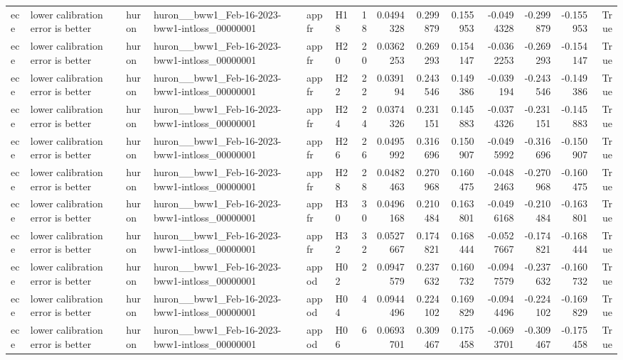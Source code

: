 \begin{longtable}{llllllrrrrrrrr}
ece & lower calibration error is better & huron & huron\_\_bww1\_Feb-16-2023-bww1-intloss\_00000001 & appfr & H18 & 18 & 0.0494328 & 0.299879 & 0.155953 & -0.0494328 & -0.299879 & -0.155953 & True \\
ece & lower calibration error is better & huron & huron\_\_bww1\_Feb-16-2023-bww1-intloss\_00000001 & appfr & H20 & 20 & 0.0362253 & 0.269293 & 0.154147 & -0.0362253 & -0.269293 & -0.154147 & True \\
ece & lower calibration error is better & huron & huron\_\_bww1\_Feb-16-2023-bww1-intloss\_00000001 & appfr & H22 & 22 & 0.039194 & 0.243546 & 0.149386 & -0.039194 & -0.243546 & -0.149386 & True \\
ece & lower calibration error is better & huron & huron\_\_bww1\_Feb-16-2023-bww1-intloss\_00000001 & appfr & H24 & 24 & 0.0374326 & 0.231151 & 0.145883 & -0.0374326 & -0.231151 & -0.145883 & True \\
ece & lower calibration error is better & huron & huron\_\_bww1\_Feb-16-2023-bww1-intloss\_00000001 & appfr & H26 & 26 & 0.0495992 & 0.316696 & 0.150907 & -0.0495992 & -0.316696 & -0.150907 & True \\
ece & lower calibration error is better & huron & huron\_\_bww1\_Feb-16-2023-bww1-intloss\_00000001 & appfr & H28 & 28 & 0.0482463 & 0.270968 & 0.160475 & -0.0482463 & -0.270968 & -0.160475 & True \\
ece & lower calibration error is better & huron & huron\_\_bww1\_Feb-16-2023-bww1-intloss\_00000001 & appfr & H30 & 30 & 0.0496168 & 0.210484 & 0.163801 & -0.0496168 & -0.210484 & -0.163801 & True \\
ece & lower calibration error is better & huron & huron\_\_bww1\_Feb-16-2023-bww1-intloss\_00000001 & appfr & H32 & 32 & 0.0527667 & 0.174821 & 0.168444 & -0.0527667 & -0.174821 & -0.168444 & True \\
ece & lower calibration error is better & huron & huron\_\_bww1\_Feb-16-2023-bww1-intloss\_00000001 & appod & H02 & 2 & 0.0947579 & 0.237632 & 0.160732 & -0.0947579 & -0.237632 & -0.160732 & True \\
ece & lower calibration error is better & huron & huron\_\_bww1\_Feb-16-2023-bww1-intloss\_00000001 & appod & H04 & 4 & 0.0944496 & 0.224102 & 0.169829 & -0.0944496 & -0.224102 & -0.169829 & True \\
ece & lower calibration error is better & huron & huron\_\_bww1\_Feb-16-2023-bww1-intloss\_00000001 & appod & H06 & 6 & 0.0693701 & 0.309467 & 0.175458 & -0.0693701 & -0.309467 & -0.175458 & True \\

\end{longtable}

